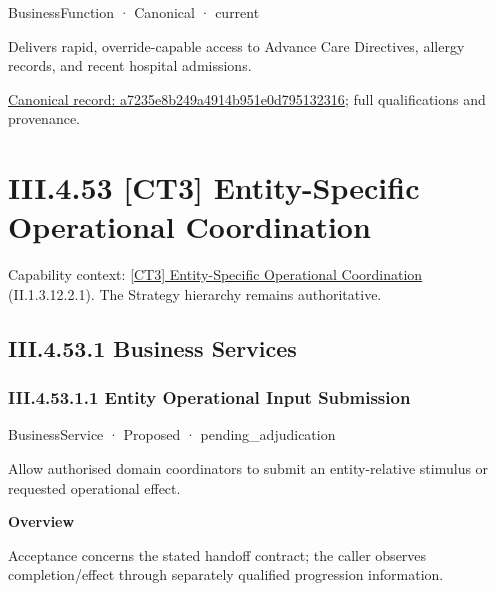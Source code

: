 \label{element:a7235e8b249a4914b951e0d795132316}
{\small BusinessFunction · Canonical · current}\par

Delivers rapid, override-capable access to Advance Care Directives, allergy records, and recent hospital admissions.


{\footnotesize \href{../../../../continuum/business/business-function/a7235e8b249a4914b951e0d795132316.md}{Canonical record: a7235e8b249a4914b951e0d795132316}; full qualifications and provenance.}\par
\section*{III.4.53 [CT3] Entity-Specific Operational Coordination}
\label{navigation:III.4.53}

{\small Capability context: \hyperref[element:9f0c1429b64f4f88982fbbda6eaec233]{[CT3] Entity-Specific Operational Coordination} (II.1.3.12.2.1). The Strategy hierarchy remains authoritative.}\par
\subsection*{III.4.53.1 Business Services}
\label{navigation:III.4.53.1}

\subsubsection*{III.4.53.1.1 Entity Operational Input Submission}
\label{navigation:III.4.53.1.1}

\label{element:6a27b36b624444d4b09e68f286045d46}
{\small BusinessService · Proposed · pending\_adjudication}\par

Allow authorised domain coordinators to submit an entity-relative stimulus or requested operational effect.



\textbf{Overview}



Acceptance concerns the stated handoff contract; the caller observes completion/effect through separately qualified progression information.



